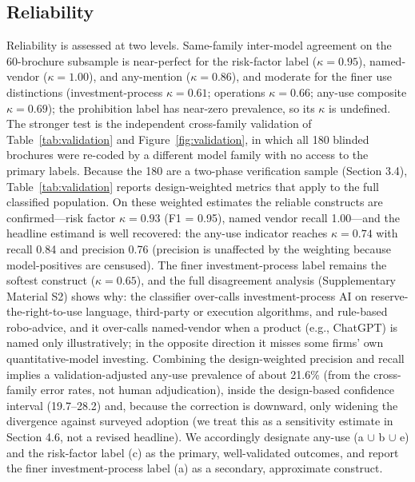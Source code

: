 \documentclass[utf8]{FrontiersinHarvard} %
\begin{document}
\subsection{Reliability}
Reliability is assessed at two levels. Same-family inter-model agreement on the 60-brochure subsample is near-perfect for the risk-factor label ($\kappa = 0.95$), named-vendor ($\kappa = 1.00$), and any-mention ($\kappa = 0.86$), and moderate for the finer use distinctions (investment-process $\kappa = 0.61$; operations $\kappa = 0.66$; any-use composite $\kappa = 0.69$); the prohibition label has near-zero prevalence, so its $\kappa$ is undefined. The stronger test is the independent cross-family validation of Table~\ref{tab:validation} and Figure~\ref{fig:validation}, in which all 180 blinded brochures were re-coded by a different model family with no access to the primary labels. Because the 180 are a two-phase verification sample (Section 3.4), Table~\ref{tab:validation} reports design-weighted metrics that apply to the full classified population. On these weighted estimates the reliable constructs are confirmed---risk factor $\kappa = 0.93$ (F1 = 0.95), named vendor recall 1.00---and the headline estimand is well recovered: the any-use indicator reaches $\kappa = 0.74$ with recall 0.84 and precision 0.76 (precision is unaffected by the weighting because model-positives are censused). The finer investment-process label remains the softest construct ($\kappa = 0.65$), and the full disagreement analysis (Supplementary Material S2) shows why: the classifier over-calls investment-process AI on reserve-the-right-to-use language, third-party or execution algorithms, and rule-based robo-advice, and it over-calls named-vendor when a product (e.g., ChatGPT) is named only illustratively; in the opposite direction it misses some firms' own quantitative-model investing. Combining the design-weighted precision and recall implies a validation-adjusted any-use prevalence of about 21.6\% (from the cross-family error rates, not human adjudication), inside the design-based confidence interval (19.7--28.2) and, because the correction is downward, only widening the divergence against surveyed adoption (we treat this as a sensitivity estimate in Section 4.6, not a revised headline). We accordingly designate any-use (a $\cup$ b $\cup$ e) and the risk-factor label (c) as the primary, well-validated outcomes, and report the finer investment-process label (a) as a secondary, approximate construct.
\end{document}
